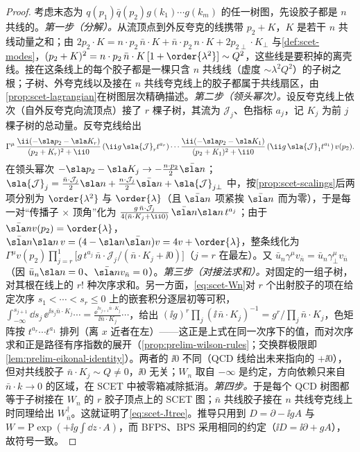 \begin{proof}
考虑末态为 $q(p_1)\bar q(p_2)g(k_1)\cdots g(k_m)$ 的任一树图，先设胶子都是 $n$ 共线的。\emph{第一步（分解）。}从流顶点到外反夸克的线携带 $p_2+K$，$K$ 是若干 $n$ 共线动量之和；由 $2p_2\cdot K=n\cdot p_2\,\bar n\cdot K+\bar n\cdot p_2\,n\cdot K+2p_{2\perp}\cdot K_\perp$ 与\cref{def:scet-modes}，$(p_2+K)^2=n\cdot p_2\,\bar n\cdot K\,[1+\order{\lambda^2}]\sim Q^2$，这些线是要积掉的离壳线。接在这条线上的每个胶子都是一棵只含 $n$ 共线线（虚度 $\sim\lambda^2Q^2$）的子树之根；子树、外夸克线以及接在 $n$ 共线夸克线上的胶子都属于共线扇区，由\cref{prop:scet-lagrangian}在树图层次精确描述。\emph{第二步（领头幂次）。}设反夸克线上依次（自外反夸克向流顶点）接了 $r$ 棵子树，其流为 $\mathcal J_j$、色指标 $a_j$，记 $K_j$ 为前 $j$ 棵子树的总动量。反夸克线给出
\[
\Gamma^\mu\,\frac{\ii(-\sla p_2-\sla K_r)}{(p_2+K_r)^2+\ii0}\,(\ii g\,\sla{\mathcal J}_r t^{a_r})\cdots\frac{\ii(-\sla p_2-\sla K_1)}{(p_2+K_1)^2+\ii0}\,(\ii g\,\sla{\mathcal J}_1t^{a_1})\,v(p_2).
\]
在领头幂次 $-\sla p_2-\sla K_j\to-\frac{n\cdot p_2}{2}\bar{\sla n}$；$\sla{\mathcal J}_j=\frac{\bar n\cdot\mathcal J_j}{2}\sla n+\frac{n\cdot\mathcal J_j}{2}\bar{\sla n}+\sla{\mathcal J}_{j\perp}$ 中，按\cref{prop:scet-scalings}后两项分别为 $\order{\lambda^2}$ 与 $\order{\lambda}$（且 $\bar{\sla n}$ 项紧挨 $\bar{\sla n}$ 而为零），于是每一对“传播子 × 顶角”化为 $\frac{g\,\bar n\cdot\mathcal J_j}{4(\bar n\cdot K_j+\ii0)}\,\bar{\sla n}\sla n\,t^{a_j}$；由于 $\bar{\sla n}v(p_2)=\order{\lambda}$，$\bar{\sla n}\sla n\,v=(4-\sla n\bar{\sla n})v=4v+\order{\lambda}$，整条线化为
$\Gamma^\mu v(p_2)\prod_{j=r}^{1}\big[g\,t^{a_j}\,\bar n\cdot\mathcal J_j/(\bar n\cdot K_j+\ii0)\big]$（$j=r$ 在最左）。又 $\bar u_n\gamma^\mu v_{\bar n}=\bar u_n\gamma_\perp^\mu v_{\bar n}$（因 $\bar u_n\sla n=0$、$\bar{\sla n}v_{\bar n}=0$）。\emph{第三步（对接法求和）。}对固定的一组子树，对其根在线上的 $r!$ 种次序求和。另一方面，\cref{eq:scet-Wn}对 $r$ 个出射胶子的项在给定次序 $s_1<\cdots<s_r\le0$ 上的嵌套积分逐层初等可积，$\int_{-\infty}^{s_{j+1}}\dd s_j\,\ee^{\ii s_j\bar n\cdot K_j}\cdots=\frac{\ee^{\ii s_{j+1}\bar n\cdot K_j}}{\ii\bar n\cdot K_j}\cdots$，给出 $(\ii g)^r\prod_j(\ii\,\bar n\cdot K_j)^{-1}=g^r/\prod_j\bar n\cdot K_j$，色矩阵按 $t^{a_r}\cdots t^{a_1}$ 排列（离 $x$ 近者在左）——这正是上式在同一次序下的值，而对次序求和正是路径有序指数的展开（\cref{prop:prelim-wilson-rules}；交换群极限即\cref{lem:prelim-eikonal-identity}）。两者的 $\ii0$ 不同（QCD 线给出未来指向的 $+\ii0$），但对共线胶子 $\bar n\cdot K_j\sim Q\neq0$，$\ii0$ 无关；$W_n$ 取自 $-\infty$ 是约定，方向依赖只来自 $\bar n\cdot k\to0$ 的区域，在 SCET 中被零箱减除抵消\cite{RothsteinStewart2016}。\emph{第四步。}于是每个 QCD 树图都等于子树接在 $W_n$ 的 $r$ 胶子顶点上的 SCET 图；$\bar n$ 共线胶子接在 $n$ 共线夸克线上时同理给出 $W_{\bar n}^\dagger$。这就证明了\cref{eq:scet-Jtree}。推导只用到 $D=\partial-\ii gA$ 与 $W=\mathrm P\exp(+\ii g\int\dd z\cdot A)$，而 BFPS、BPS 采用相同的约定（$\ii D=\ii\partial+gA$），故符号一致。
\end{proof}

